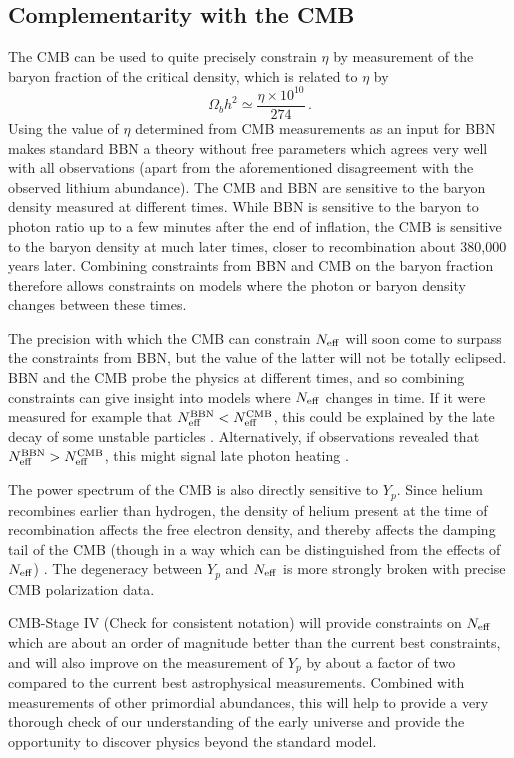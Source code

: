 \subsection{Complementarity with the CMB}\label{Complementarity}
The CMB can be used to quite precisely constrain $\eta$ by measurement of the baryon fraction of the critical density, which is related to $\eta$ by
\begin{equation}
	\Omega_b h^2 \simeq \frac{\eta\times10^{10}}{274} \, .
\end{equation}
Using the value of $\eta$ determined from CMB measurements as an input for BBN makes standard BBN a theory without free parameters which agrees very well with all observations (apart from the aforementioned disagreement with the observed lithium abundance).  The CMB and BBN are sensitive to the baryon density measured at different times.  While BBN is sensitive to the baryon to photon ratio up to a few minutes after the end of inflation, the CMB is sensitive to the baryon density at much later times, closer to recombination about 380,000 years later.  Combining constraints from BBN and CMB on the baryon fraction therefore allows constraints on models where the photon or baryon density changes between these times.

The precision with which the CMB can constrain $N_{\rm eff}$ will soon come to surpass the constraints from BBN, but the value of the latter will not be totally eclipsed.  BBN and the CMB probe the physics at different times, and so combining constraints can give insight into models where $N_{\rm eff}$ changes in time.  If it were measured for example that $N_{\rm eff}^{\mathrm{BBN}}<N_{\rm eff}^{\mathrm{CMB}}$, this could be explained by the late decay of some unstable particles \cite{Fischler:2010xz,Menestrina:2011mz,Hooper:2011aj}.  Alternatively, if observations revealed that $N_{\rm eff}^{\mathrm{BBN}}>N_{\rm eff}^{\mathrm{CMB}}$, this might signal late photon heating \cite{Cadamuro:2010cz,Millea:2015qra}.

The power spectrum of the CMB is also directly sensitive to $Y_p$.  Since helium recombines earlier than hydrogen, the density of helium present at the time of recombination affects the free electron density, and thereby affects the damping tail of the CMB (though in a way which can be distinguished from the effects of $N_{\rm eff}$) \cite{Bashinsky:2003tk,Hou:2011ec,Follin:2015hya,Baumann:2015rya}.  The degeneracy between $Y_p$ and $N_{\rm eff}$ is more strongly broken with precise CMB polarization data.

CMB-Stage IV {\color{blue} (Check for consistent notation)} will provide constraints on $N_{\rm eff}$ which are about an order of magnitude better than the current best constraints, and will also improve on the measurement of $Y_p$ by about a factor of two compared to the current best astrophysical measurements.  Combined with measurements of other primordial abundances, this will help to provide a very thorough check of our understanding of the early universe and provide the opportunity to discover physics beyond the standard model.










